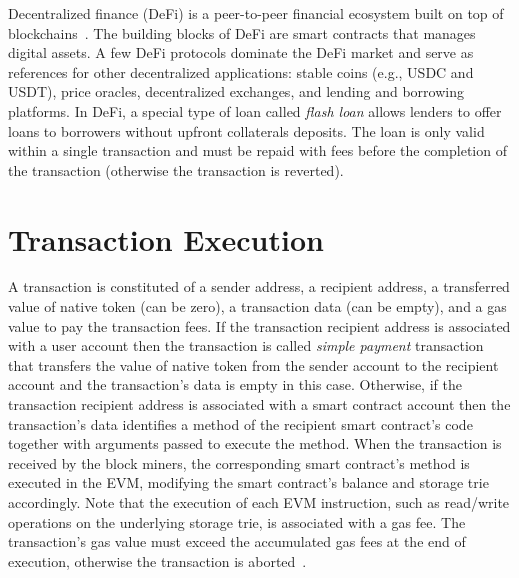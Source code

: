 Decentralized finance (DeFi) is a peer-to-peer financial ecosystem built on top of
blockchains~\cite{wust2018you}. The building blocks of DeFi are smart contracts
that manages digital assets. 
A few DeFi protocols dominate the DeFi market and serve as references for other
decentralized applications: stable coins (e.g., USDC and USDT), price oracles,
decentralized exchanges, and lending and borrowing platforms. 
In DeFi, a special type of loan called \emph{flash
loan} allows lenders to offer loans to borrowers without upfront collaterals
deposits. The loan is only valid within a single transaction and must be repaid
with fees before the completion of the transaction (otherwise the transaction
is reverted). 
 



\section{Transaction Execution} 

A transaction is constituted of a sender address, a recipient address, a
transferred value of native token (can be zero), a transaction data (can be
empty), and a gas value to pay the transaction fees. If the transaction
recipient address is associated with a user account then the transaction is
called \emph{simple payment} transaction that transfers the value of native
token from the sender account to the recipient account and the transaction's
data is empty in this case. Otherwise, if the transaction recipient address is
associated with a smart contract account then the transaction's data identifies
a method of the recipient smart contract's code together with arguments passed
to execute the method. When the transaction is received by the block miners,
the corresponding smart contract's method is executed in the EVM, modifying the
smart contract's balance and storage trie accordingly. Note that the execution
of each EVM instruction, such as read/write operations on the underlying
storage trie, is associated with a gas fee. The transaction's gas value must
exceed the accumulated gas fees at the end of execution, otherwise the
transaction is aborted~\cite{ethereum22,buterin2014ethereum}.



